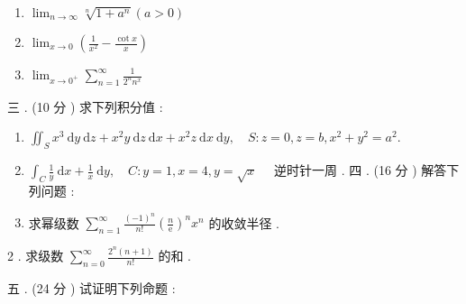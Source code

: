 \documentclass[10pt]{article}
\begin{document}
\begin{enumerate}
  \item $\lim _{n \rightarrow \infty} \sqrt[n]{1+a^{n}}(a>0)$

  \item $\lim _{x \rightarrow 0}\left(\frac{1}{x^{2}}-\frac{\cot x}{x}\right)$

  \item $\lim _{x \rightarrow 0^{+}} \sum_{n=1}^{\infty} \frac{1}{2^{n} n^{x}}$

\end{enumerate}
 三 . (10  分 )  求下列积分值 :

\begin{enumerate}
  \item $\iint_{S} x^{3} \mathrm{~d} y \mathrm{~d} z+x^{2} y \mathrm{~d} z \mathrm{~d} x+x^{2} z \mathrm{~d} x \mathrm{~d} y, \quad S: z=0, z=b, x^{2}+y^{2}=a^{2} .$

  \item $\int_{C} \frac{1}{y} \mathrm{~d} x+\frac{1}{x} \mathrm{~d} y, \quad C: y=1, x=4, y=\sqrt{x} \quad$  逆时针一周 .  四 . (16  分 )  解答下列问题 :

  \item  求幂级数  $\sum_{n=1}^{\infty} \frac{(-1)^{n}}{n !}\left(\frac{n}{\mathrm{e}}\right)^{n} x^{n}$  的收敛半径 .

\end{enumerate}
2 .  求级数  $\sum_{n=0}^{\infty} \frac{2^{n}(n+1)}{n !}$  的和 .

 五 . (24  分 )  试证明下列命题 :
\end{document}
